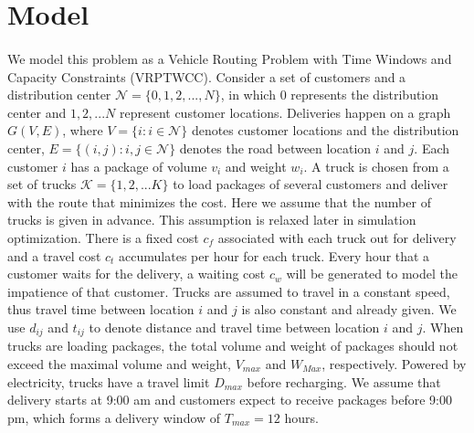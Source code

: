 \documentclass[12pt]{article}
\numberwithin{equation}{section}
\begin{document}
\section{Model}\label{model}
	
	\paragraph{}We model this problem as a Vehicle Routing Problem with Time Windows and Capacity Constraints (VRPTWCC)\parencite{Schneider2016}.  Consider a set of customers and a distribution center $\mathcal {N}=\{0,1,2,..., N\}$, in which 0 represents the distribution center and $1,2,...N$ represent customer locations. Deliveries happen on a graph $G(V, E)$, where $V=\{i: i\in \mathcal{N}\}$ denotes customer locations and the distribution center, $E=\{(i,j):i,j\in \mathcal{N}\}$ denotes the road between location $i$ and $j$.  Each customer $i$ has a package of volume $v_i$ and weight $w_i$. A truck is chosen from a set of trucks $\mathcal{K}=\{1,2,...K\}$ to load packages of several customers and deliver with the route that minimizes the cost. Here we assume that the number of trucks is given in advance. This assumption is relaxed later in simulation optimization. There is a fixed cost $c_f$ associated with each truck out for delivery and a travel cost $c_t$ accumulates per hour for each truck. Every hour that a customer waits for the delivery, a waiting cost $c_w$ will be generated to model the impatience of that customer. Trucks are assumed to travel in a constant speed, thus travel time between location $i$ and $j$ is also constant and already given. We use $d_{ij}$ and $t_{ij}$ to denote distance and travel time between location $i$ and $j$. When trucks are loading packages, the total volume and weight of packages should not exceed the maximal volume and weight, $V_{max}$ and $W_{Max}$, respectively. Powered by electricity, trucks have a travel limit $D_{max}$ before recharging. We assume that delivery starts at 9:00 am and customers expect to receive packages before 9:00 pm, which forms a delivery window of $T_{max}=12$ hours.
	
\end{document}

